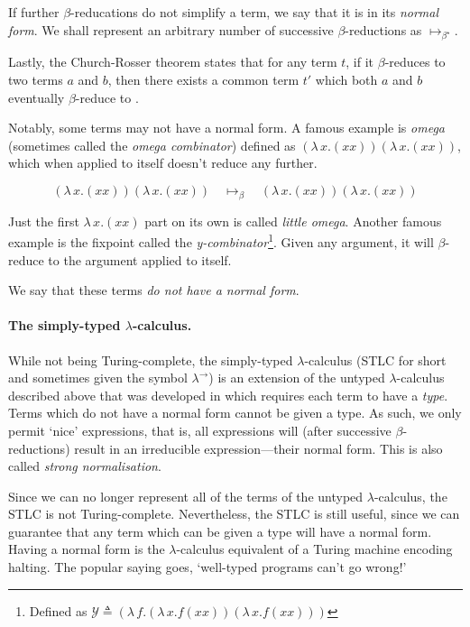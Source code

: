 \documentclass[logo,bsc,singlespacing,parskip,online]{infthesis}
\begin{document}
If further $\beta$-reducations do not simplify a term, we say that it is in its
\textit{normal form}. We shall represent an arbitrary number of successive
$\beta$-reductions as $\mapsto_{\beta^{\star}}$.

Lastly, the Church-Rosser theorem states that for any term $t$, if it
$\beta$-reduces to two terms $a$ and $b$, then there exists a common term $t'$
which both $a$ and $b$ eventually $\beta$-reduce to
\citep{church_properties_1936}.

Notably, some terms may not have a normal form. A famous example is
\textit{omega} (sometimes called the \textit{omega combinator}) defined as
$(\lambda \, x. (x x)) (\lambda \, x. (x x))$, which when applied to itself
doesn't reduce any further.

\begin{equation*}
  (\lambda \, x. (x x)) (\lambda \, x. (x x)) \quad \mapsto_{\beta} \quad (\lambda \, x. (x x)) (\lambda \, x. (x x))
\end{equation*}

Just the first $\lambda \, x. (x x)$ part on its own is called \textit{little
omega}. Another famous example is the fixpoint called the
\textit{y-combinator}\footnote{Defined as $\mathcal{Y} \triangleq (\lambda \, f.
(\lambda \, x. f (x x )) (\lambda \, x. f (xx)))$}. Given any argument, it will
$\beta$-reduce to the argument applied to itself.

We say that these terms \textit{do not have a normal form}.

\paragraph*{The simply-typed $\lambda$-calculus.} While not being
Turing-complete, the simply-typed $\lambda$-calculus (STLC for short and
sometimes given the symbol $\lambda^{\rightarrow}$) is an extension of the
untyped $\lambda$-calculus described above that was developed in
\citet{church_formulation_1940} which requires each term to have a
\textit{type}. Terms which do not have a normal form cannot be given a type. As
such, we only permit `nice' expressions, that is, all expressions will (after
successive $\beta$-reductions) result in an irreducible expression---their
normal form. This is also called \textit{strong normalisation}.
\citep{pierce_types_2002}

Since we can no longer represent all of the terms of the untyped
$\lambda$-calculus, the STLC is not Turing-complete. Nevertheless, the STLC is
still useful, since we can guarantee that any term which can be given a type
will have a normal form. Having a normal form is the $\lambda$-calculus
equivalent of a Turing machine encoding halting. The popular saying goes,
`well-typed programs can't go wrong!' \citep{milner_theory_1978}
\end{document}
